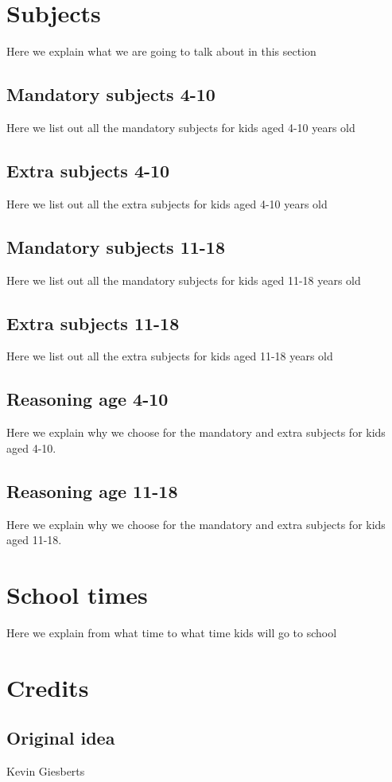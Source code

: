 \documentclass[titlepage]{article}
\begin{document}
\newpage
\section{Subjects}
Here we explain what we are going to talk about in this section
\subsection{Mandatory subjects 4-10}
Here we list out all the mandatory subjects for kids aged 4-10 years old
\subsection{Extra subjects 4-10}
Here we list out all the extra subjects for kids aged 4-10 years old
\subsection{Mandatory subjects 11-18}
Here we list out all the mandatory subjects for kids aged 11-18 years old
\subsection{Extra subjects 11-18}
Here we list out all the extra subjects for kids aged 11-18 years old
\subsection{Reasoning age 4-10}
Here we explain why we choose for the mandatory and extra subjects for kids aged 4-10.
\subsection{Reasoning age 11-18}
Here we explain why we choose for the mandatory and extra subjects for kids aged 11-18.

\newpage
\section{School times}
Here we explain from what time to what time kids will go to school

\newpage
\section{Credits}
\subsection{Original idea}
Kevin Giesberts
\end{document}
